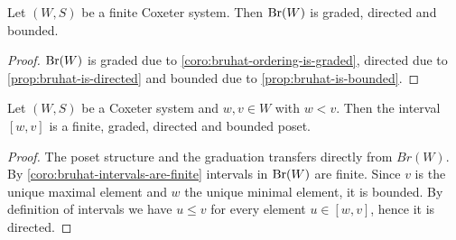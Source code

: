 \begin{coro}
	Let $(W,S)$ be a finite Coxeter system. Then $\operatorname{Br}(W)$ is graded, directed and bounded.

	\begin{proof}
		$\operatorname{Br}(W)$ is graded due to \ref{coro:bruhat-ordering-is-graded}, directed due to \ref{prop:bruhat-is-directed} and bounded due to \ref{prop:bruhat-is-bounded}.
	\end{proof}
\end{coro}

\begin{coro}
	Let $(W,S)$ be a Coxeter system and $w,v \in W$ with $w < v$. Then the interval $[w,v]$ is a finite, graded, directed and bounded poset.

	\begin{proof}
		The poset structure and the graduation transfers directly from $Br(W)$. By \ref{coro:bruhat-intervals-are-finite} intervals in $\operatorname{Br}(W)$ are finite. Since $v$ is the unique maximal element and $w$ the unique minimal element, it is bounded. By definition of intervals we have $u \leq v$ for every element $u \in [w,v]$, hence it is directed.
	\end{proof}
\end{coro}